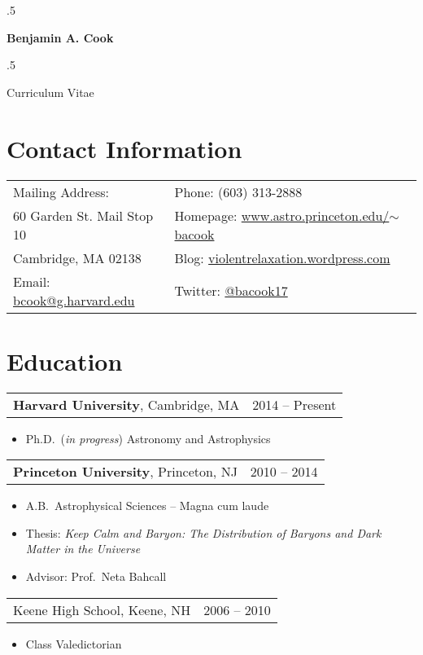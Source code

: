 \documentclass{res}
\newcommand\mancenter[1]{\moveleft.5\hoffset\centerline{#1}}
\begin{document}
  
\mancenter{\huge \bf{Benjamin A. Cook}}
\mancenter{\huge Curriculum Vitae} 

\begin{resume}                        

\section{\textbf{Contact Information}}
\vspace{.1in}
\begin{tabular}{@{}p{2.5in} p{2.5in}}
Mailing Address: & Phone: (603) 313-2888\\
60 Garden St. Mail Stop 10 & Homepage:
\href{http://www.astro.princeton.edu/~bacook}{www.astro.princeton.edu/$\sim$bacook}\\
Cambridge, MA 02138 & Blog:
\href{http://violentrelaxation.wordpress.com}{violentrelaxation.wordpress.com}\\
Email: \href{mailto:bcook@g.harvard.edu}{bcook@g.harvard.edu} &
Twitter: \href{https://twitter.com/bacook17}{@bacook17}\\
\end{tabular}


\section{\textbf{Education}}
\vspace{.1in}
\begin{tabular}{@{}p{4in} r@{}}
\textbf{Harvard University}, Cambridge, MA & 2014 -- Present
\end{tabular}
\begin{itemize} \itemsep -2pt
\item[] Ph.D.~(\textit{in progress}) Astronomy and Astrophysics
\end{itemize}

\begin{tabular}{@{}p{4in} r@{}}
\textbf{Princeton University}, Princeton, NJ & 2010 -- 2014
\end{tabular}
\begin{itemize} \itemsep -2pt
\item[] A.B.~Astrophysical Sciences -- Magna cum laude
\item[] Thesis: \textit{Keep Calm and Baryon: The Distribution of
  Baryons and Dark Matter in the Universe}
\item[] Advisor: Prof.~Neta Bahcall
\end{itemize}

\begin{tabular}{@{}p{4in} r@{}}
  Keene High School, Keene, NH & 2006 -- 2010
\end{tabular}
\begin{itemize} \itemsep -2pt
\item[] Class Valedictorian
\end{itemize}


\end{resume}
\end{document}
